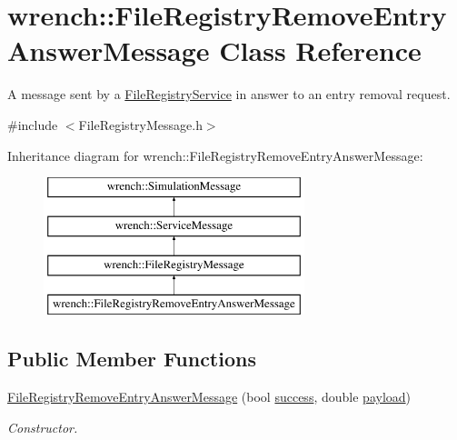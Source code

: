 \hypertarget{classwrench_1_1_file_registry_remove_entry_answer_message}{}\section{wrench\+:\+:File\+Registry\+Remove\+Entry\+Answer\+Message Class Reference}
\label{classwrench_1_1_file_registry_remove_entry_answer_message}


A message sent by a \hyperlink{classwrench_1_1_file_registry_service}{File\+Registry\+Service} in answer to an entry removal request.  




{\ttfamily \#include $<$File\+Registry\+Message.\+h$>$}

Inheritance diagram for wrench\+:\+:File\+Registry\+Remove\+Entry\+Answer\+Message\+:\begin{figure}[H]
\begin{center}
\leavevmode
\includegraphics[height=4.000000cm]{classwrench_1_1_file_registry_remove_entry_answer_message}
\end{center}
\end{figure}
\subsection*{Public Member Functions}
\begin{DoxyCompactItemize}
\item 
\hyperlink{classwrench_1_1_file_registry_remove_entry_answer_message_a8df6a5b3664ab9bd434ca7923aaa5beb}{File\+Registry\+Remove\+Entry\+Answer\+Message} (bool \hyperlink{classwrench_1_1_file_registry_remove_entry_answer_message_a5edfc1eaec9d8bc8ea7795bc4a114dd1}{success}, double \hyperlink{classwrench_1_1_simulation_message_a914f2732713f7c02898e66f05a7cb8a1}{payload})
\begin{DoxyCompactList}\small\item\em Constructor. \end{DoxyCompactList}\end{DoxyCompactItemize}

